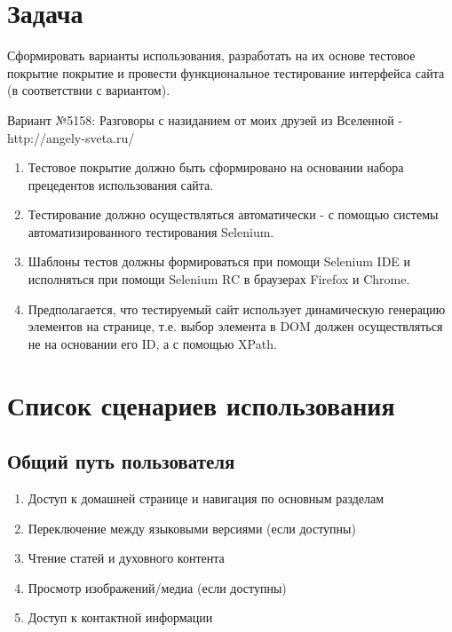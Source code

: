 \section{Задача}

Сформировать варианты использования, разработать на их основе тестовое покрытие покрытие и провести функциональное тестирование интерфейса сайта (в соответствии с вариантом).

Вариант №5158: Разговоры с назиданием от моих друзей из Вселенной - http://angely-sveta.ru/

\begin{enumerate}
    \item Тестовое покрытие должно быть сформировано на основании набора прецедентов использования сайта.
    \item Тестирование должно осуществляться автоматически - с помощью системы автоматизированного тестирования Selenium.
    \item Шаблоны тестов должны формироваться при помощи Selenium IDE и исполняться при помощи Selenium RC в браузерах Firefox и Chrome.
    \item Предполагается, что тестируемый сайт использует динамическую генерацию элементов на странице, т.е. выбор элемента в DOM должен осуществляться не на основании его ID, а с помощью XPath.
\end{enumerate}

\section{Список сценариев использования}

\subsection{Общий путь пользователя}
\begin{enumerate}
    \item Доступ к домашней странице и навигация по основным разделам
    \item Переключение между языковыми версиями (если доступны)
    \item Чтение статей и духовного контента
    \item Просмотр изображений/медиа (если доступны)
    \item Доступ к контактной информации
\end{enumerate}

